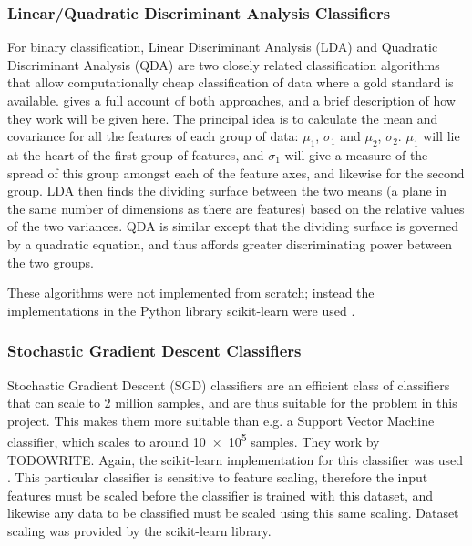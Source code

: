 \documentclass[pdftex,12pt,a4paper]{report}
\begin{document}

\subsubsection{Linear/Quadratic Discriminant Analysis Classifiers}

For binary classification, Linear Discriminant Analysis (LDA) and Quadratic Discriminant Analysis
(QDA) are two closely related classification algorithms that allow computationally cheap
classification of data where a gold standard is available. \textcite{TODOCITE} gives a full account of
both approaches, and a brief description of how they work will be given here. The principal idea is
to calculate the mean and covariance for all the features of each group of data: $\mu_1$, $\sigma_1$
and $\mu_2$, $\sigma_2$. $\mu_1$ will lie at the heart of the first group of features, and
$\sigma_1$ will give a measure of the spread of this group amongst each of the feature axes, and
likewise for the second group. LDA then finds the dividing surface between the two means (a plane in
the same number of dimensions as there are features) based on the relative values of the two
variances. QDA is similar except that the dividing surface is governed by a quadratic equation, and
thus affords greater discriminating power between the two groups.

These algorithms were not implemented from scratch; instead the implementations in the Python
library scikit-learn were used \parencite{scikitLearn2011}.

\subsubsection{Stochastic Gradient Descent Classifiers}
Stochastic Gradient Descent (SGD) classifiers are an efficient class of classifiers that can scale
to 2 million samples, and are thus suitable for the problem in this project. This makes them more
suitable than e.g. a Support Vector Machine classifier, which scales to around \SI{10e5}{} samples.
They work by TODOWRITE.
Again, the scikit-learn implementation for this classifier was used \parencite{scikitLearn2011}.
This particular classifier is sensitive to feature scaling, therefore the input features must be
scaled before the classifier is trained with this dataset, and likewise any data to be classified
must be scaled using this same scaling. Dataset scaling was provided by the scikit-learn library.
\end{document}
